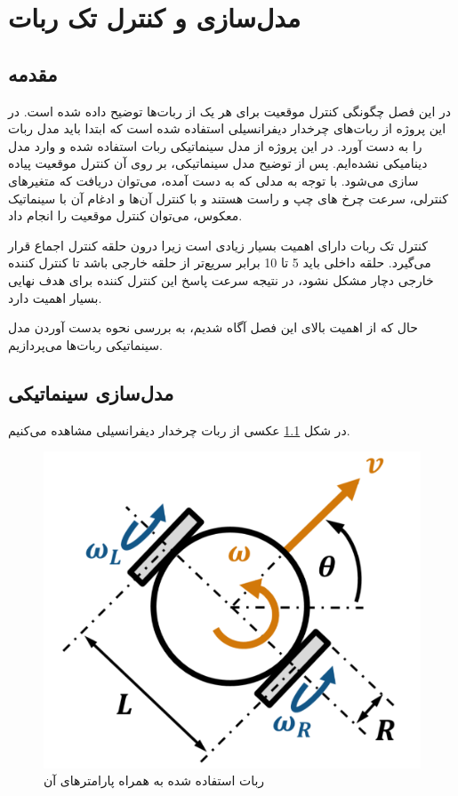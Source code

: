 \chapter{مدل‌سازی و کنترل تک ربات‌}\label{ch one robot}
\section{مقدمه}
در این فصل چگونگی کنترل موقعیت برای هر یک از ربات‌ها توضیح داده شده است. در این پروژه از ربات‌های چرخدار دیفرانسیلی  استفاده شده است که ابتدا باید مدل ربات را به دست آورد. در این پروژه از مدل سینماتیکی  ربات استفاده شده و وارد مدل دینامیکی نشده‌ایم. پس از توضیح مدل سینماتیکی، بر روی آن کنترل موقعیت پیاده سازی می‌شود. با توجه به مدلی که به دست آمده، می‌توان دریافت که متغیرهای کنترلی، سرعت چرخ های چپ و راست هستند و با کنترل آن‌ها و ادغام آن با سینماتیک معکوس، می‌توان کنترل موقعیت را انجام داد.

کنترل تک ربات دارای اهمیت بسیار زیادی است زیرا درون حلقه کنترل اجماع قرار می‌گیرد. حلقه داخلی باید 5 تا 10 برابر سریع‌تر از حلقه خارجی باشد تا کنترل کننده خارجی دچار مشکل نشود، در نتیجه سرعت پاسخ این کنترل کننده برای هدف نهایی بسیار اهمیت دارد.

حال که از اهمیت بالای این فصل آگاه شدیم، به بررسی نحوه بدست آوردن مدل سینماتیکی ربات‌ها می‌پردازیم.
 
\section{مدل‌سازی سینماتیکی}

در شکل \ref{Fig differential-robot} عکسی از ربات چرخدار دیفرانسیلی مشاهده می‌کنیم. 
\begin{figure}[!h]
	\centering
	\includegraphics[scale=0.4]{Images/differential-robot-matlab.png}
	\caption{ربات استفاده شده به همراه پارامترهای آن}\label{Fig differential-robot}
\end{figure}

